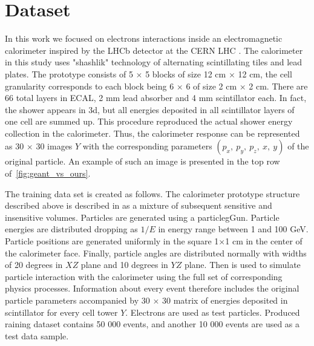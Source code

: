 \section{Dataset}
In this work we focused on electrons interactions inside an electromagnetic calorimeter inspired by the LHCb detector at the CERN LHC \cite{Alves:2008zz} . The calorimeter in this study uses "shashlik" technology of alternating scintillating tiles and lead plates. The prototype  consists of 5 $\times$ 5 blocks of size 12 cm $\times$ 12 cm, the cell granularity corresponds to each block being 6 $\times$ 6 of size 2 cm $\times$ 2 cm. There are 66 total layers in ECAL, 2 mm lead absorber and 4 mm scintillator each. In fact, the shower appears in 3d, but all energies deposited in all scintillator layers of one cell are summed up. This procedure reproduced the actual shower energy collection in the calorimeter. Thus, the calorimeter response can be represented as 30 $\times$ 30 images $Y$ with the corresponding parameters $(p_x,~ p_y,~ p_z,~ x,~ y)$ of the original particle. An example of such an image is presented in the top row of~\cref{fig:geant_vs_ours}.

The training data set is created as follows. The calorimeter prototype structure described above is described in \geant as a  mixture of subsequent sensitive and insensitive volumes. Particles are generated using a particlegGun. Particle energies are distributed dropping as $1/E$ in energy range between 1 and 100 GeV. Particle positions are generated uniformly in the square 1$\times$1 cm in the center of the calorimeter face. Finally, particle angles are distributed normally with widths of 20 degrees in $XZ$ plane and 10 degrees in $YZ$ plane. Then \geant  is used to simulate particle interaction with the calorimeter using the full set of corresponding physics processes. Information about every event therefore includes the original particle parameters accompanied by 30 $\times$ 30 matrix of energies deposited in scintillator for every cell tower $Y$. Electrons are used as test particles. Produced raining dataset contains 50 000 events, and another 10 000 events are used as a  test data sample.

